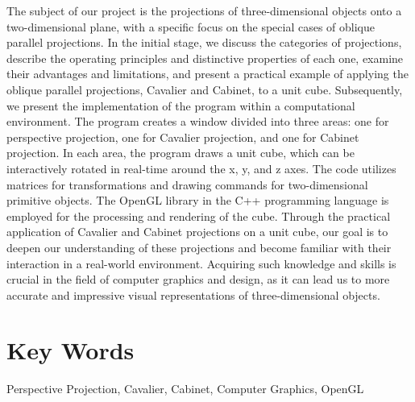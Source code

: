 The subject of our project is the projections of three-dimensional objects onto a two-dimensional plane, with a specific focus on the special cases of oblique parallel projections. In the initial stage, we discuss the categories of projections, describe the operating principles and distinctive properties of each one, examine their advantages and limitations, and present a practical example of applying the oblique parallel projections, Cavalier and Cabinet, to a unit cube. Subsequently, we present the implementation of the program within a computational environment. The program creates a window divided into three areas: one for perspective projection, one for Cavalier projection, and one for Cabinet projection. In each area, the program draws a unit cube, which can be interactively rotated in real-time around the x, y, and z axes. The code utilizes matrices for transformations and drawing commands for two-dimensional primitive objects. The OpenGL library in the C++ programming language is employed for the processing and rendering of the cube. Through the practical application of Cavalier and Cabinet projections on a unit cube, our goal is to deepen our understanding of these projections and become familiar with their interaction in a real-world environment. Acquiring such knowledge and skills is crucial in the field of computer graphics and design, as it can lead us to more accurate and impressive visual representations of three-dimensional objects.

\vspace{1.5em}

\section*{\textlatin{Key Words}}
\textlatin{Perspective Projection, Cavalier, Cabinet, Computer Graphics, OpenGL}
